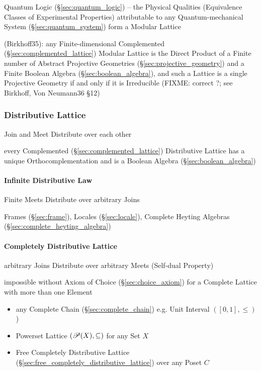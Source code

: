 Quantum Logic (\S\ref{sec:quantum_logic}) -- the Physical Qualities (Equivalence
Classes of Experimental Properties) attributable to any Quantum-mechanical
System (\S\ref{sec:quantum_system}) form a Modular Lattice

(Birkhoff35): any Finite-dimensional Complemented
(\S\ref{sec:complemented_lattice}) Modular Lattice is the Direct Product of a
Finite number of Abstract Projective Geometries
(\S\ref{sec:projective_geometry}) and a Finite Boolean Algebra
(\S\ref{sec:boolean_algebra}), and such a
Lattice is a single Projective Geometry if and only if it is Irreducible
(FIXME: correct ?; see Birkhoff, Von Neumann36 \S 12)



\subsubsection{Distributive Lattice}\label{sec:distributive_lattice}

Join and Meet Distribute over each other

every Complemented (\S\ref{sec:complemented_lattice}) Distributive Lattice has a
unique Orthocomplementation and is a Boolean Algebra
(\S\ref{sec:boolean_algebra})



\paragraph{Infinite Distributive Law}\label{sec:infinite_distributive}\hfill

Finite Meets Distribute over arbitrary Joins

Frames (\S\ref{sec:frame}), Locales (\S\ref{sec:locale}), Complete
Heyting Algebras (\S\ref{sec:complete_heyting_algebra})



\paragraph{Completely Distributive Lattice}
\label{sec:completely_distributive}\hfill

arbitrary Joins Distribute over arbitrary Meets (Self-dual Property)

impossible without Axiom of Choice (\S\ref{sec:choice_axiom}) for a
Complete Lattice with more than one Element

\begin{itemize}
  \item any Complete Chain (\S\ref{sec:complete_chain}) e.g. Unit
    Interval $([0,1], \leq)$)
  \item Powerset Lattice $(\mathscr{P}(X), \subseteq)$ for any Set
    $X$
  \item Free Completely Distributive Lattice
    (\S\ref{sec:free_completely_distributive_lattice}) over any Poset
    $C$
\end{itemize}



